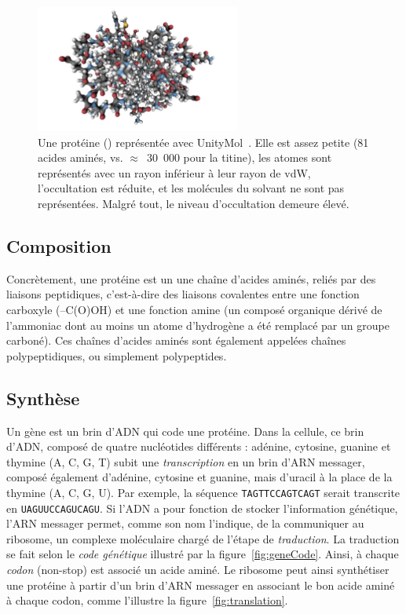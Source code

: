 \begin{appendices}
	\begin{figure}[htbp]
		\centering
		\includegraphics[width=0.60\textwidth]{figures/ch1/1KX2}
		\caption[Une protéine en \emph{Hyperballs}]{Une protéine (\cite{bartalesi2002solution}) représentée avec UnityMol~\cite{doutreligne2014unitymol}. Elle est assez petite (81 acides aminés, vs. $\approx$~30~000 pour la titine), les atomes sont représentés avec un rayon inférieur à leur rayon de vdW, l'occultation est réduite, et les molécules du solvant ne sont pas représentées. Malgré tout, le niveau d'occultation demeure élevé.}
		\label{fig:1KX2}
	\end{figure}
	
	\subsection{Composition}
	Concrètement, une protéine est un une chaîne d'acides aminés, reliés par des liaisons peptidiques, c'est-à-dire des liaisons covalentes entre une fonction carboxyle (–C(O)OH) et une fonction amine (un composé organique dérivé de l'ammoniac dont au moins un atome d'hydrogène a été remplacé par un groupe carboné). Ces chaînes d'acides aminés sont également appelées chaînes polypeptidiques, ou simplement polypeptides.
	
	\subsection{Synthèse}
	Un gène est un brin d'ADN qui \og code \fg{}  une protéine. Dans la cellule, ce brin d'ADN, composé de quatre nucléotides différents : adénine, cytosine, guanine et thymine (A, C, G, T) subit une \emph{transcription} en un brin d'ARN messager, composé également d'adénine, cytosine et guanine, mais d'uracil à la place de la thymine (A, C, G, U). Par exemple, la séquence \texttt{TAGTTCCAGTCAGT} serait transcrite en \texttt{UAGUUCCAGUCAGU}. Si l'ADN a pour fonction de stocker l'information génétique, l'ARN messager permet, comme son nom l'indique, de la communiquer au ribosome, un complexe moléculaire chargé de l'étape de \emph{traduction}. La traduction se fait selon le \emph{code génétique} illustré par la figure~\ref{fig:geneCode}. Ainsi, à chaque \emph{codon} (non-stop) est associé un acide aminé. Le ribosome peut ainsi synthétiser une protéine à partir d'un brin d'ARN messager en associant le bon acide aminé à chaque codon, comme l'illustre la figure~\ref{fig:translation}.
	

\end{appendices}
